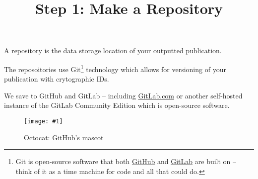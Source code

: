 \documentclass{article}
\newlength{\imgwidth}
\newcommand\scaledgraphics[2]{%
                
\settowidth{\imgwidth}{\texttt{[image: \#1]}}%
                
\setlength{\imgwidth}{\minof{\imgwidth}{#2\textwidth}}%
                
\texttt{[image: \#1]}%
                
}
\begin{document}
\title{Step 1: Make a Repository}

\maketitle


A repository is the data storage location of your outputted publication.


The reposoitories use Git\footnote{Git is open-source software that both \href{https://github.com/}{GitHub} and \href{https://about.gitlab.com/}{GitLab} are built on – think of it as a time machine for code and all that could do.} technology which allows for versioning of your publication with crytographic IDs.


We save to GitHub and GitLab \autocite{PerkelJeffrey2016} – including \href{GitLab.com}{GitLab.com} or another self-hosted instance of the GitLab Community Edition which is open-source software.

\begin{figure}
\scaledgraphics{5656f6ad-7ef0-4a57-9d81-9fc2ecfc77bc.png}{0.5}
\caption*{Octocat: GitHub's mascot}\label{F44428261}
\end{figure}





\printbibliography[title={Bibliography}]
\end{document}
